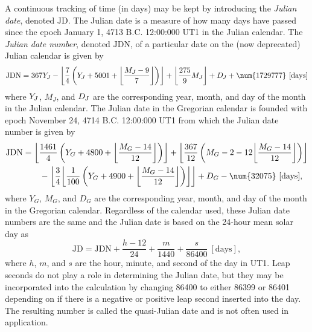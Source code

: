 \documentclass[11pt,dvipsnames]{thesis}
\DeclarePairedDelimiter{\floor}{\lfloor}{\rfloor}
\begin{document}
A continuous tracking of time (in days) may be kept by introducing the \textit{Julian date}, denoted $\mathrm{JD}$. The Julian date is a measure of how many days have passed since the epoch January 1, 4713 B.C. 12:00:000 UT1 in the Julian calendar. The \textit{Julian date number}, denoted $\mathrm{JDN}$, of a particular date on the (now deprecated) Julian calendar is given by
\begin{equation}
\mathrm{JDN} = 367 Y_{\hspace{-0.05em}J} - \floor*{\frac{7}{4}\left(Y_{\hspace{-0.05em}J} + 5001 + \floor*{\frac{M_J - 9}{7}}\right)} + \floor*{\frac{275}{9} M_J} + D_{\hspace{-0.05em}J} + \num{1729777} \ [\mathrm{days}]
\end{equation}
where $Y_{\hspace{-0.05em}J}$, $M_J$, and $D_{\hspace{-0.05em}J}$ are the corresponding year, month, and day of the month in the Julian calendar.
%
The Julian date in the Gregorian calendar is founded with epoch November 24, 4714 B.C. 12:00:000 UT1 from which the Julian date number is given by
\begin{align}
\mathrm{JDN} &= \floor*{\frac{1461}{4}\left(Y_G + 4800 + \floor*{\frac{M_G - 14}{12}}\right)} + \floor*{\frac{367}{12}\left(M_G - 2 - 12 \floor*{\frac{M_G - 14}{12}}\right)} \nonumber\\&\qquad - \floor*{\frac{3}{4}\floor*{\frac{1}{100}\left(Y_G + 4900 + \floor*{\frac{M_G - 14}{12}}\right)}} + D_G - \num{32075} \ [\mathrm{days}],
\end{align}
where $Y_G$, $M_G$, and $D_G$ are the corresponding year, month, and day of the month in the Gregorian calendar.
%
Regardless of the calendar used, these Julian date numbers are the same and the Julian date is based on the 24-hour mean solar day as
\begin{equation}
\mathrm{JD} = \mathrm{JDN} + \frac{h - 12}{24} + \frac{m}{\num{1440}} + \frac{s}{\num{86400}} \ [\mathrm{days}],
\end{equation}
where $h$, $m$, and $s$ are the hour, minute, and second of the day in UT1. Leap seconds do not play a role in determining the Julian date, but they may be incorporated into the calculation by changing 86400 to either 86399 or 86401 depending on if there is a negative or positive leap second inserted into the day. The resulting number is called the quasi-Julian date and is not often used in application.
\end{document}
